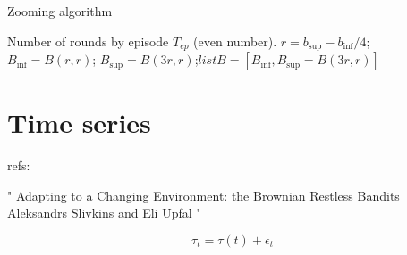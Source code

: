 \documentclass[11pt]{article}
\begin{document}
\begin{algorithm}[H]
  \caption{Zooming algorithm}
  \label{code:zoom}
  \begin{algorithmic}[0]
  \Require Number of rounds by episode $T_{ep}$ (even number).
  \State $r = b_{\sup} - b_{\inf}/4$; $B_{\inf} = B(r, r)$; $B_{\sup} = B(3r, r)$;$listB = [B_{\inf}, B_{\sup} = B(3r, r)]$ 

\end{algorithmic}
\end{algorithm}



\section{Time series}
refs:

"
Adapting to a Changing Environment: the Brownian Restless Bandits
Aleksandrs Slivkins
and Eli Upfal
"

$$\tau_t = \tau(t) + \epsilon_t$$ 
\newpage
%
\end{document}
